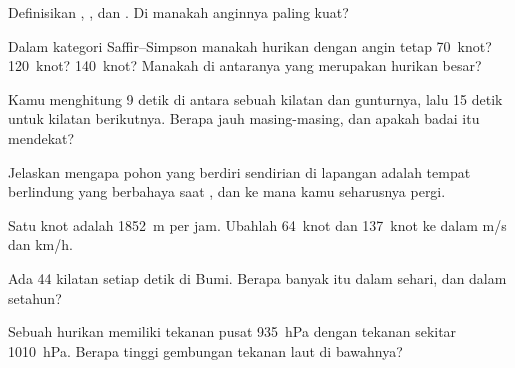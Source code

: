 \begin{exercise}[$\star$]\label{exo:g10:storms-and-cyclones:2}
Definisikan , , dan . Di manakah anginnya
paling kuat?
\end{exercise}

\begin{exercise}[$\star$]\label{exo:g10:storms-and-cyclones:3}
Dalam kategori Saffir--Simpson manakah hurikan dengan angin tetap
\num{70}~knot? \num{120}~knot? \num{140}~knot? Manakah di antaranya yang
merupakan hurikan besar?
\end{exercise}

\begin{exercise}[$\star$]\label{exo:g10:storms-and-cyclones:4}
Kamu menghitung \num{9} detik di antara sebuah kilatan dan gunturnya, lalu
\num{15} detik untuk kilatan berikutnya. Berapa jauh masing-masing, dan apakah
badai itu mendekat?
\end{exercise}

\begin{exercise}[$\star$]\label{exo:g10:storms-and-cyclones:5}
Jelaskan mengapa pohon yang berdiri sendirian di lapangan adalah tempat
berlindung yang berbahaya saat , dan ke mana kamu seharusnya
pergi.
\end{exercise}

\begin{exercise}[$\star\star$]\label{exo:g10:storms-and-cyclones:6}
Satu knot adalah \qty{1852}{m} per jam. Ubahlah \num{64}~knot dan
\num{137}~knot ke dalam \unit{m/s} dan \unit{km/h}.
\end{exercise}

\begin{exercise}[$\star\star$]\label{exo:g10:storms-and-cyclones:7}
Ada 44 kilatan  setiap detik di Bumi. Berapa banyak itu dalam sehari,
dan dalam setahun?
\end{exercise}

\begin{exercise}[$\star\star$]\label{exo:g10:storms-and-cyclones:8}
Sebuah hurikan memiliki tekanan pusat \qty{935}{hPa} dengan tekanan sekitar
\qty{1010}{hPa}. Berapa tinggi gembungan tekanan laut di bawahnya?
\end{exercise}

